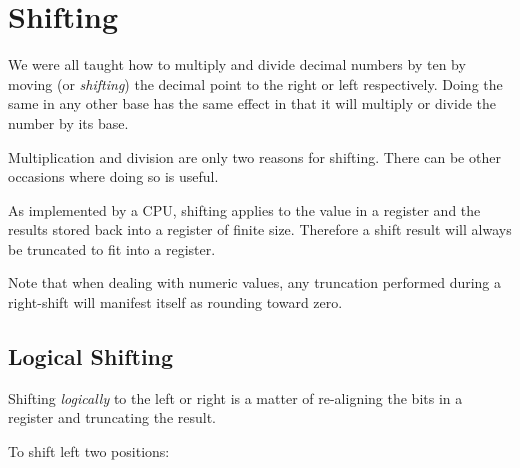 \begin{figure}[ht]
\centering
{}
\label{Figure:ZeroExtend}
\end{figure}


\section{Shifting}
\label{shifting}

We were all taught how to multiply and divide decimal numbers by ten
by moving (or {\em shifting}) the decimal point to the right or left 
respectively.  Doing the same in any other base has the same effect 
in that it will multiply or divide the number by its base.

%
Multiplication and division are only two reasons for shifting.  There
can be other occasions where doing so is useful.

As implemented by a CPU, shifting applies to the value in a register
and the results stored back into a register of finite size.  Therefore
a shift result will always be truncated to fit into a register.

%
Note that when dealing with numeric values, any truncation performed 
during a right-shift will manifest itself as rounding toward zero.

\subsection{Logical Shifting}

Shifting {\em logically} to the left or right is a matter of re-aligning
the bits in a register and truncating the result.

%
To shift left two positions:

\\

